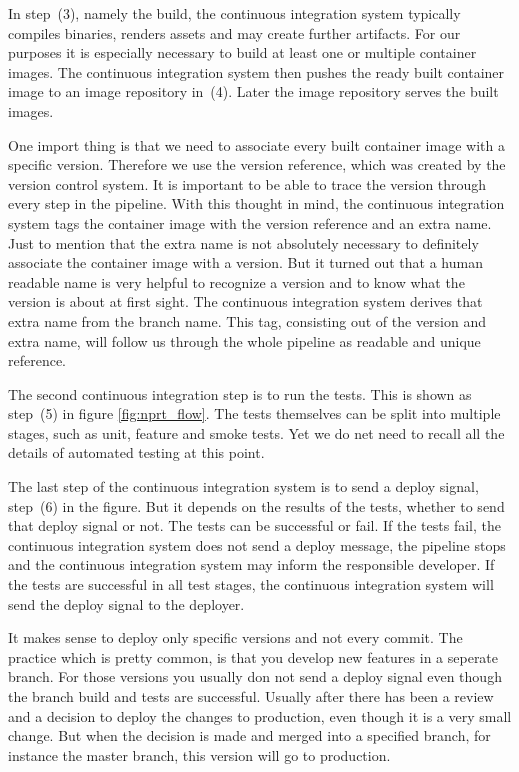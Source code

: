 In step~(3), namely the build, the continuous integration system typically compiles
binaries, renders assets and may create further artifacts. For our purposes it is
especially necessary to build at least one or multiple container images. The continuous
integration system then pushes the ready built container image to an image repository
in~(4). Later the image repository serves the built images.

One import thing is that we need to associate every built container image with a specific
version. Therefore we use the version reference, which was created by the version control
system. It is important to be able to trace the version through every step in the
pipeline. With this thought in mind, the continuous integration system tags the container
image with the version reference and an extra name. Just to mention that the extra name is
not absolutely necessary to definitely associate the container image with a version. But
it turned out that a human readable name is very helpful to recognize a version and to
know what the version is about at first sight. The continuous integration system derives
that extra name from the branch name. This tag, consisting out of the version and extra
name, will follow us through the whole pipeline as readable and unique reference.

The second continuous integration step is to run the tests. This is shown as step~(5) in
figure \ref{fig:nprt_flow}. The tests themselves can be split into multiple stages, such
as unit, feature and smoke tests. Yet we do net need to recall all the details of
automated testing at this point.

The last step of the continuous integration system is to send a deploy signal, step~(6) in
the figure. But it depends on the results of the tests, whether to send that deploy signal
or not. The tests can be successful or fail. If the tests fail, the continuous integration
system does not send a deploy message, the pipeline stops and the continuous integration
system may inform the responsible developer. If the tests are successful in all test
stages, the continuous integration system will send the deploy signal to the deployer.

It makes sense to deploy only specific versions and not every commit. The practice which
is pretty common, is that you develop new features in a seperate branch. For those
versions you usually don not send a deploy signal even though the branch build and tests
are successful. Usually after there has been a review and a decision to deploy the changes
to production, even though it is a very small change. But when the decision is made and
merged into a specified branch, for instance the master branch, this version will go to
production.

